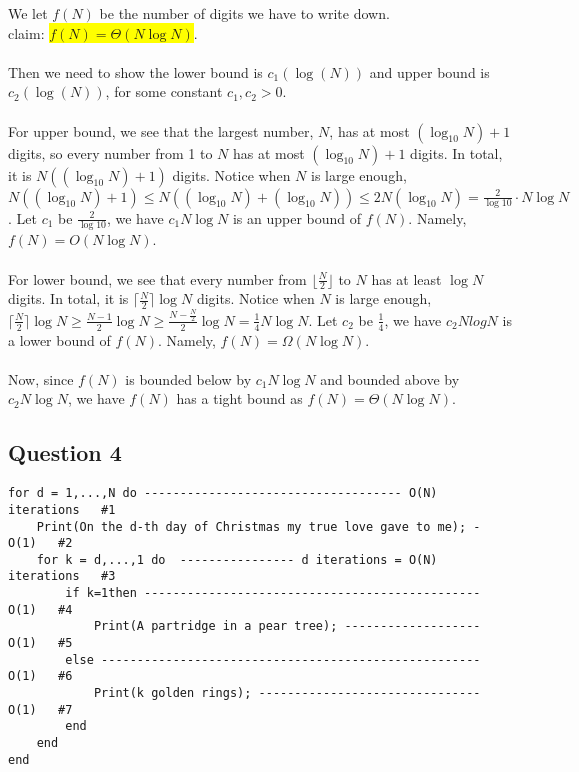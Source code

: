 \documentclass[12pt]{article}
\begin{document}
We let $f(N)$ be the number of digits we have to write down.\\
claim: \colorbox{yellow}{$f(N) = \Theta(N \log N)$}.\\
\\
Then we need to show the lower bound is $c_1(\log(N))$ and upper bound is $c_2(\log(N))$, for some constant $c_1,c_2 > 0$.\\
\\
For upper bound, we see that the largest number, $N$, has at most $(\log_{10} N) + 1$ digits, so every number from 1 to $N$ has at most $(\log_{10} N) + 1$ digits. In total, it is $N((\log_{10} N) + 1)$ digits. Notice when $N$ is large enough, $N((\log_{10} N) + 1) \leq N((\log_{10} N) + (\log_{10} N)) \leq 2N(\log_{10} N) = \frac{2}{\log 10}\cdot N\log N$. Let $c_1$ be $\frac{2}{\log 10}$, we have $c_1 N \log N$ is an upper bound of $f(N)$. Namely, $f(N) = O(N \log N)$.\\
\\
For lower bound, we see that every number from $\lfloor \frac{N}{2} \rfloor$ to $N$ has at least $\log{N}$ digits. In total, it is $\lceil \frac{N}{2} \rceil \log {N}$ digits. Notice when $N$ is large enough, $\lceil \frac{N}{2} \rceil \log {N} \geq \frac{N - 1}{2}\log N \geq \frac{N - \frac{N}{2}}{2}\log N = \frac{1}{4} N \log N$. Let $c_2$ be $\frac{1}{4}$, we have $c_2 N log N$ is a lower bound of $f(N)$. Namely, $f(N) = \Omega(N \log N)$.\\
\\
Now, since $f(N)$ is bounded below by $c_1 N \log N$ and bounded above by $c_2 N \log N$, we have $f(N)$ has a tight bound as $f(N) = \Theta(N \log N)$.
\par\null\par
\subsection*{Question 4}

\begin{lstlisting}
for d = 1,...,N do ------------------------------------ O(N) iterations   #1
    Print(On the d-th day of Christmas my true love gave to me); - O(1)   #2
    for k = d,...,1 do  ---------------- d iterations = O(N) iterations   #3
        if k=1then ----------------------------------------------- O(1)   #4
            Print(A partridge in a pear tree); ------------------- O(1)   #5
        else ----------------------------------------------------- O(1)   #6
            Print(k golden rings); ------------------------------- O(1)   #7
        end
    end
end
\end{lstlisting}
\end{document}
